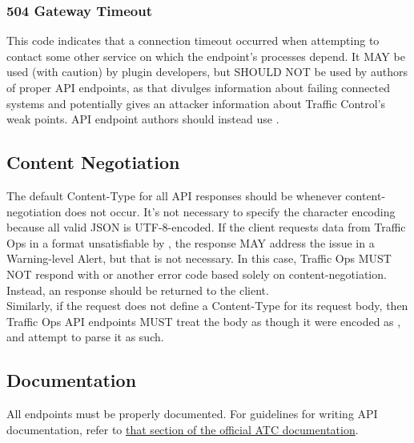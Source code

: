 \subsubsection{504 Gateway Timeout}
This code indicates that a connection timeout occurred when attempting to contact some other service on which the endpoint's processes depend. It MAY be used
(with caution) by plugin developers, but SHOULD NOT be used by authors of proper API endpoints, as that divulges information about failing connected systems
and potentially gives an attacker information about Traffic Control's weak points. API endpoint authors should instead use .

\subsection{Content Negotiation}
The default Content-Type for all API responses should be  whenever content-negotiation does not occur. It's not
necessary to specify the character encoding because all valid JSON is UTF-8-encoded. If the client requests data from Traffic Ops in a
format unsatisfiable by , the response MAY address the issue in a Warning-level Alert, but that is not
necessary. In this case, Traffic Ops MUST NOT respond with  or another error code based solely on content-negotiation.
Instead, an  response should be returned to the client.\\
Similarly, if the request does not define a Content-Type for its request body, then Traffic Ops API endpoints MUST treat the body as though it
were encoded as , and attempt to parse it as such.

\subsection{Documentation}
All endpoints must be properly documented. For guidelines for writing API documentation, refer to
\href{https://traffic-control-cdn.readthedocs.io/en/latest/development/documentation_guidelines.html#documenting-api-routes}{that section of the official ATC documentation}.


